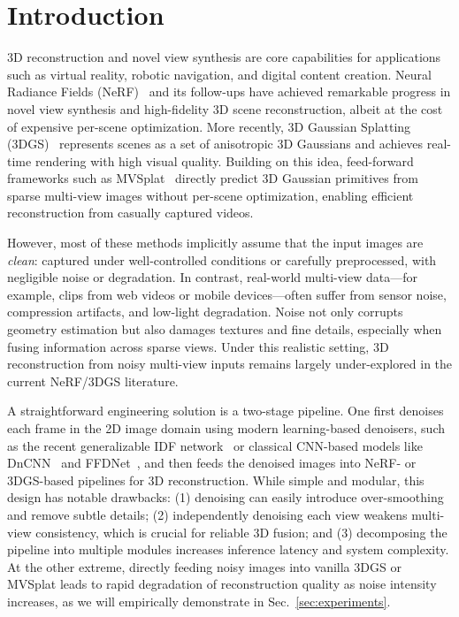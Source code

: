 \section{Introduction}
\label{sec:intro}

3D reconstruction and novel view synthesis are core capabilities for applications such as virtual reality, robotic navigation, and digital content creation. Neural Radiance Fields (NeRF)~\cite{mildenhall2020nerf} and its follow-ups have achieved remarkable progress in novel view synthesis and high-fidelity 3D scene reconstruction, albeit at the cost of expensive per-scene optimization. More recently, 3D Gaussian Splatting (3DGS)~\cite{kerbl3Dgaussians} represents scenes as a set of anisotropic 3D Gaussians and achieves real-time rendering with high visual quality. Building on this idea, feed-forward frameworks such as MVSplat~\cite{chen2024mvsplat} directly predict 3D Gaussian primitives from sparse multi-view images without per-scene optimization, enabling efficient reconstruction from casually captured videos.

However, most of these methods implicitly assume that the input images are \emph{clean}: captured under well-controlled conditions or carefully preprocessed, with negligible noise or degradation. In contrast, real-world multi-view data---for example, clips from web videos or mobile devices---often suffer from sensor noise, compression artifacts, and low-light degradation. Noise not only corrupts geometry estimation but also damages textures and fine details, especially when fusing information across sparse views. Under this realistic setting, 3D reconstruction from noisy multi-view inputs remains largely under-explored in the current NeRF/3DGS literature.

A straightforward engineering solution is a two-stage pipeline. One first denoises each frame in the 2D image domain using modern learning-based denoisers, such as the recent generalizable IDF network~\cite{kim2025idf} or classical CNN-based models like DnCNN~\cite{zhang2017dncnn} and FFDNet~\cite{zhang2018ffdnet}, and then feeds the denoised images into NeRF- or 3DGS-based pipelines for 3D reconstruction. While simple and modular, this design has notable drawbacks: (1) denoising can easily introduce over-smoothing and remove subtle details; (2) independently denoising each view weakens multi-view consistency, which is crucial for reliable 3D fusion; and (3) decomposing the pipeline into multiple modules increases inference latency and system complexity. At the other extreme, directly feeding noisy images into vanilla 3DGS or MVSplat leads to rapid degradation of reconstruction quality as noise intensity increases, as we will empirically demonstrate in Sec.~\ref{sec:experiments}.

